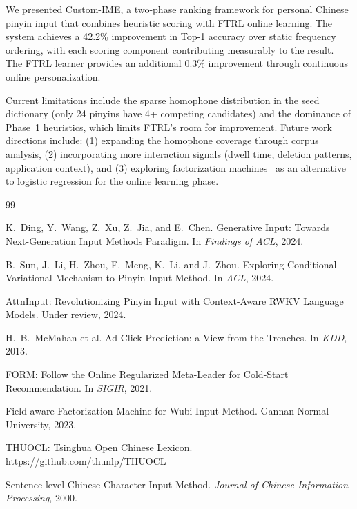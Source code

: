\documentclass[11pt]{article}
\begin{document}
We presented Custom-IME, a two-phase ranking framework for personal Chinese
pinyin input that combines heuristic scoring with FTRL online learning. The
system achieves a 42.2\% improvement in Top-1 accuracy over static frequency
ordering, with each scoring component contributing measurably to the result.
The FTRL learner provides an additional 0.3\% improvement through continuous
online personalization.

Current limitations include the sparse homophone distribution in the seed
dictionary (only 24 pinyins have 4+ competing candidates) and the dominance
of Phase~1 heuristics, which limits FTRL's room for improvement. Future work
directions include: (1) expanding the homophone coverage through corpus
analysis, (2) incorporating more interaction signals (dwell time, deletion
patterns, application context), and (3) exploring factorization
machines~\cite{ffm_wubi} as an alternative to logistic regression for the
online learning phase.


\begin{thebibliography}{99}

K.~Ding, Y.~Wang, Z.~Xu, Z.~Jia, and E.~Chen.
Generative Input: Towards Next-Generation Input Methods Paradigm.
In \emph{Findings of ACL}, 2024.

B.~Sun, J.~Li, H.~Zhou, F.~Meng, K.~Li, and J.~Zhou.
Exploring Conditional Variational Mechanism to Pinyin Input Method.
In \emph{ACL}, 2024.

AttnInput: Revolutionizing Pinyin Input with Context-Aware RWKV Language Models.
Under review, 2024.

H.~B.~McMahan et al.
Ad Click Prediction: a View from the Trenches.
In \emph{KDD}, 2013.

FORM: Follow the Online Regularized Meta-Leader for Cold-Start Recommendation.
In \emph{SIGIR}, 2021.

Field-aware Factorization Machine for Wubi Input Method.
Gannan Normal University, 2023.

THUOCL: Tsinghua Open Chinese Lexicon.
\url{https://github.com/thunlp/THUOCL}

Sentence-level Chinese Character Input Method.
\emph{Journal of Chinese Information Processing}, 2000.

\end{thebibliography}
\end{document}
